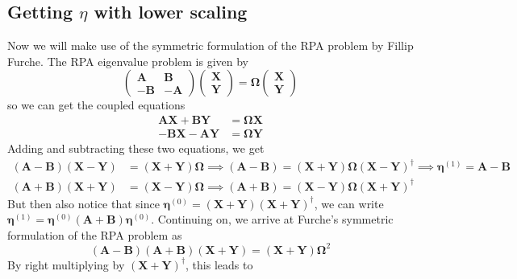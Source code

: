 \subsection{Getting $\eta$ with lower scaling}
Now we will make use of the symmetric formulation of the RPA problem by Fillip Furche. The RPA eigenvalue problem is given by
\begin{equation}
    \begin{pmatrix}
        \bm{A} & \bm{B} \\
        -\bm{B} & -\bm{A}
    \end{pmatrix}
    \begin{pmatrix}
        \bm{X}\\
        \bm{Y}
    \end{pmatrix}
    = \bm{\Omega}
    \begin{pmatrix}
        \bm{X}\\
        \bm{Y}
    \end{pmatrix}
\end{equation}
so we can get the coupled equations
\begin{align}
    \bm{A}\bm{X} + \bm{B}\bm{Y} &= \bm{\Omega}\bm{X}\\
    -\bm{B}\bm{X} - \bm{A}\bm{Y} &= \bm{\Omega}\bm{Y}
\end{align}
Adding and subtracting these two equations, we get
\begin{align}
    \left(\bm{A} - \bm{B}\right)\left(\bm{X}-\bm{Y}\right) &= \left(\bm{X}+\bm{Y}\right)\bm{\Omega} \implies \left(\bm{A} - \bm{B}\right) = \left(\bm{X}+\bm{Y}\right)\bm{\Omega}\left(\bm{X}-\bm{Y}\right)^{\dag} \implies \boxed{\bm{\eta}^{(1)} = \bm{A}-\bm{B}}\\
    \left(\bm{A} + \bm{B}\right)\left(\bm{X}+\bm{Y}\right) &= \left(\bm{X}-\bm{Y}\right)\bm{\Omega} \implies \left(\bm{A} + \bm{B}\right) = \left(\bm{X}-\bm{Y}\right)\bm{\Omega}\left(\bm{X}+\bm{Y}\right)^{\dag}
\end{align}
But then also notice that since $\bm{\eta}^{(0)} = \left(\bm{X}+\bm{Y}\right)\left(\bm{X}+\bm{Y}\right)^{\dag}$, we can write $\bm{\eta}^{(1)} = \bm{\eta}^{(0)}\left(\bm{A}+\bm{B}\right)\bm{\eta}^{(0)}$. Continuing on, we arrive at Furche's symmetric formulation of the RPA problem as
\begin{equation}
    \left(\bm{A} - \bm{B}\right)\left(\bm{A} + \bm{B}\right)\left(\bm{X}+\bm{Y}\right) = \left(\bm{X}+\bm{Y}\right)\bm{\Omega}^2
\end{equation}
By right multiplying by $\left(\bm{X}+\bm{Y}\right)^{\dag}$, this leads to
